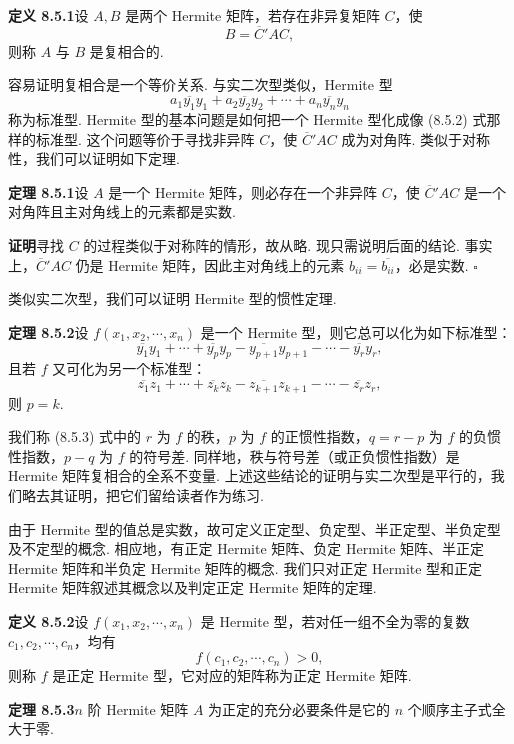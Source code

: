 \documentclass[UTF8,12pt,a4paper,fontset=fandol]{ctexart}
\begin{document}
\noindent\textbf{定义 8.5.1}\quad 设 $A,B$ 是两个 Hermite 矩阵，若存在非异复矩阵 $C$，使
\[
B=\overline{C}'AC,
\]
则称 $A$ 与 $B$ 是复相合的.

容易证明复相合是一个等价关系. 与实二次型类似，Hermite 型
\begin{equation}
a_1\overline{y_1}y_1+a_2\overline{y_2}y_2+\cdots+a_n\overline{y_n}y_n
\tag{8.5.2}
\end{equation}
称为标准型. Hermite 型的基本问题是如何把一个 Hermite 型化成像 (8.5.2) 式那样的标准型. 这个问题等价于寻找非异阵 $C$，使 $\overline{C}'AC$ 成为对角阵. 类似于对称性，我们可以证明如下定理.

\noindent\textbf{定理 8.5.1}\quad 设 $A$ 是一个 Hermite 矩阵，则必存在一个非异阵 $C$，使 $\overline{C}'AC$ 是一个对角阵且主对角线上的元素都是实数.

\noindent\textbf{证明}\quad 寻找 $C$ 的过程类似于对称阵的情形，故从略. 现只需说明后面的结论. 事实上，$\overline{C}'AC$ 仍是 Hermite 矩阵，因此主对角线上的元素 $b_{ii}=\overline{b_{ii}}$，必是实数. $\square$

类似实二次型，我们可以证明 Hermite 型的惯性定理.

\noindent\textbf{定理 8.5.2}\quad 设 $f(x_1,x_2,\cdots,x_n)$ 是一个 Hermite 型，则它总可以化为如下标准型：
\begin{equation}
\overline{y_1}y_1+\cdots+\overline{y_p}y_p-\overline{y_{p+1}}y_{p+1}-\cdots-\overline{y_r}y_r,
\tag{8.5.3}
\end{equation}
且若 $f$ 又可化为另一个标准型：
\[
\overline{z_1}z_1+\cdots+\overline{z_k}z_k-\overline{z_{k+1}}z_{k+1}-\cdots-\overline{z_r}z_r,
\]
则 $p=k$.

我们称 (8.5.3) 式中的 $r$ 为 $f$ 的秩，$p$ 为 $f$ 的正惯性指数，$q=r-p$ 为 $f$ 的负惯性指数，$p-q$ 为 $f$ 的符号差. 同样地，秩与符号差（或正负惯性指数）是 Hermite 矩阵复相合的全系不变量. 上述这些结论的证明与实二次型是平行的，我们略去其证明，把它们留给读者作为练习.

由于 Hermite 型的值总是实数，故可定义正定型、负定型、半正定型、半负定型及不定型的概念. 相应地，有正定 Hermite 矩阵、负定 Hermite 矩阵、半正定 Hermite 矩阵和半负定 Hermite 矩阵的概念. 我们只对正定 Hermite 型和正定 Hermite 矩阵叙述其概念以及判定正定 Hermite 矩阵的定理.

\noindent\textbf{定义 8.5.2}\quad 设 $f(x_1,x_2,\cdots,x_n)$ 是 Hermite 型，若对任一组不全为零的复数 $c_1,c_2,\cdots,c_n$，均有
\[
f(c_1,c_2,\cdots,c_n)>0,
\]
则称 $f$ 是正定 Hermite 型，它对应的矩阵称为正定 Hermite 矩阵.

\noindent\textbf{定理 8.5.3}\quad $n$ 阶 Hermite 矩阵 $A$ 为正定的充分必要条件是它的 $n$ 个顺序主子式全大于零.
\end{document}
